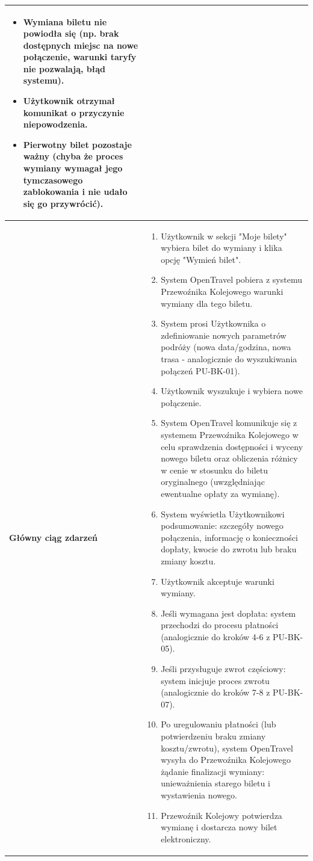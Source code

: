 \documentclass[a4paper,12pt]{article}
\begin{document}
\begin{longtable}{|p{\pierwszakolumnaszerokoscPUBKWymiana}|p{\drugakolumnaszerokoscPUBKWymiana}|}
\begin{itemize}
            \item Wymiana biletu nie powiodła się (np. brak dostępnych miejsc na nowe połączenie, warunki taryfy nie pozwalają, błąd systemu).
            \item Użytkownik otrzymał komunikat o przyczynie niepowodzenia.
            \item Pierwotny bilet pozostaje ważny (chyba że proces wymiany wymagał jego tymczasowego zablokowania i nie udało się go przywrócić).
        \end{itemize} \\
    \hline
    \textbf{Główny ciąg zdarzeń} &
        \begin{enumerate} \itemsep0pt \parskip0pt \parsep0pt
            \item Użytkownik w sekcji "Moje bilety" wybiera bilet do wymiany i klika opcję "Wymień bilet".
            \item System OpenTravel pobiera z systemu Przewoźnika Kolejowego warunki wymiany dla tego biletu.
            \item System prosi Użytkownika o zdefiniowanie nowych parametrów podróży (nowa data/godzina, nowa trasa - analogicznie do wyszukiwania połączeń PU-BK-01).
            \item Użytkownik wyszukuje i wybiera nowe połączenie.
            \item System OpenTravel komunikuje się z systemem Przewoźnika Kolejowego w celu sprawdzenia dostępności i wyceny nowego biletu oraz obliczenia różnicy w cenie w stosunku do biletu oryginalnego (uwzględniając ewentualne opłaty za wymianę).
            \item System wyświetla Użytkownikowi podsumowanie: szczegóły nowego połączenia, informację o konieczności dopłaty, kwocie do zwrotu lub braku zmiany kosztu.
            \item Użytkownik akceptuje warunki wymiany.
            \item Jeśli wymagana jest dopłata: system przechodzi do procesu płatności (analogicznie do kroków 4-6 z PU-BK-05).
            \item Jeśli przysługuje zwrot częściowy: system inicjuje proces zwrotu (analogicznie do kroków 7-8 z PU-BK-07).
            \item Po uregulowaniu płatności (lub potwierdzeniu braku zmiany kosztu/zwrotu), system OpenTravel wysyła do Przewoźnika Kolejowego żądanie finalizacji wymiany: unieważnienia starego biletu i wystawienia nowego.
            \item Przewoźnik Kolejowy potwierdza wymianę i dostarcza nowy bilet elektroniczny.

\end{enumerate}
\end{longtable}
\end{document}
